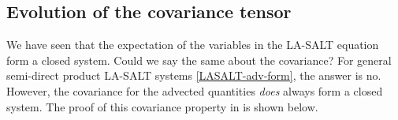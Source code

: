 \documentclass[11pt, oneside]{article}   	%
\numberwithin{equation}{section}
\theoremstyle{plain}
\theoremstyle{definition}
\theoremstyle{remark}
\newcommand{\<}{\langle}
\renewcommand{\>}{\rangle}
\begin{document}
\subsection{Evolution of the covariance tensor}
We have seen that the expectation of the variables in the LA-SALT equation form a closed system. Could we say the same about the covariance? For general semi-direct product LA-SALT systems \eqref{LASALT-adv-form}, the answer is no. However, the covariance for the advected quantities {\em does} always form a closed system. The proof of this covariance property in \cite{DieAytJNLS} is shown below.  





\end{document}
